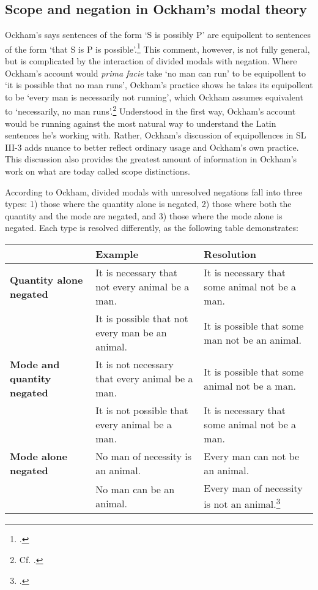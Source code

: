 \documentclass[]{article}
\begin{document}
\subsection{Scope and negation in Ockham's modal theory}
Ockham's says sentences of the form `S is possibly P' are equipollent to sentences of the form `that S is P is possible'.\footnote{\cite[II.9, p. 273; 10, p. 276]{OckhamSL}.} This comment, however, is not fully general, but is complicated by the interaction of divided modals with negation. Where Ockham's account would \textit{prima facie} take `no man can run' to be equipollent to `it is possible that no man runs', Ockham's practice shows he takes its equipollent to be `every man is necessarily not running', which Ockham assumes equivalent to `necessarily, no man runs'.\footnote{Cf. \cite[III-3.14, p. 645; 36, p. 720]{OckhamSL}.} Understood in the first way, Ockham's account would be running against the most natural way to understand the Latin sentences he's working with. Rather, Ockham's discussion of equipollences in SL III-3 adds nuance to better reflect ordinary usage and Ockham's own practice. This discussion also provides the greatest amount of information in Ockham's work on what are today called scope distinctions.

According to Ockham, divided modals with unresolved negations fall into three types: 1) those where the quantity alone is negated, 2) those where both the quantity and the mode are negated, and 3) those where the mode alone is negated. Each type is resolved differently, as the following table demonstrates:
\begin{center}
	\begin{tabular}{|p{3cm}|p{4cm}|p{4cm}|}
		\hline & \textbf{Example} & \textbf{Resolution}  \\
		\hline \textbf{Quantity alone negated}  & It is necessary that not every animal be a man. & It is necessary that some animal not be a man. \\
		& It is possible that not every man be an animal. & It is possible that some man not be an animal. \\ \hline 
		\textbf{Mode and quantity negated} & It is not necessary that every animal be a man. & It is possible that some animal not be a man. \\
		& It is not possible that every animal be a man. & It is necessary that some animal not be a man. \\ \hline 
		\textbf{Mode alone negated} & No man of necessity is an animal. & Every man can not be an animal. \\
		& No man can be an animal. & Every man of necessity is not an animal.\footnote{\cite[III-3.14, pp. 644-646]{OckhamSL}.} \\ \hline
	\end{tabular}
\end{center}
\bigskip
\end{document}
